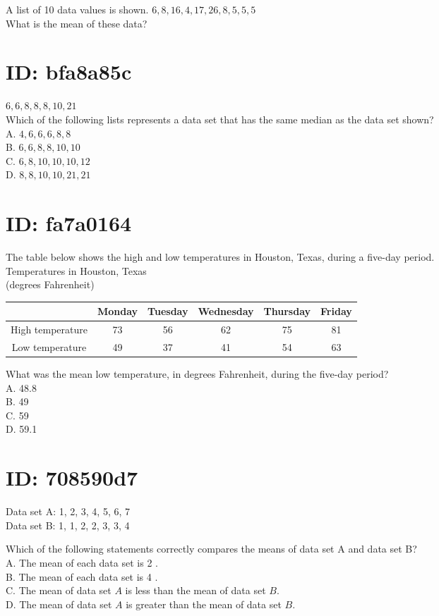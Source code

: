 A list of 10 data values is shown. $6,8,16,4,17,26,8,5,5,5$\\
What is the mean of these data?

\section*{ID: bfa8a85c}
$6,6,8,8,8,10,21$\\
Which of the following lists represents a data set that has the same median as the data set shown?\\
A. $4,6,6,6,8,8$\\
B. $6,6,8,8,10,10$\\
C. $6,8,10,10,10,12$\\
D. $8,8,10,10,21,21$

\section*{ID: fa7a0164}
The table below shows the high and low temperatures in Houston, Texas, during a five-day period.\\
Temperatures in Houston, Texas\\
(degrees Fahrenheit)

\begin{center}
\begin{tabular}{|c|c|c|c|c|c|}
\cline { 2 - 6 }
\multicolumn{1}{c|}{} & Monday & Tuesday & Wednesday & Thursday & Friday \\
\hline
High temperature & 73 & 56 & 62 & 75 & 81 \\
\hline
Low temperature & 49 & 37 & 41 & 54 & 63 \\
\hline
\end{tabular}
\end{center}

What was the mean low temperature, in degrees Fahrenheit, during the five-day period?\\
A. 48.8\\
B. 49\\
C. 59\\
D. 59.1

\section*{ID: 708590d7}
Data set A: 1, 2, 3, 4, 5, 6, 7\\
Data set B: 1, 1, 2, 2, 3, 3, 4

Which of the following statements correctly compares the means of data set A and data set B?\\
A. The mean of each data set is 2 .\\
B. The mean of each data set is 4 .\\
C. The mean of data set $A$ is less than the mean of data set $B$.\\
D. The mean of data set $A$ is greater than the mean of data set $B$.


